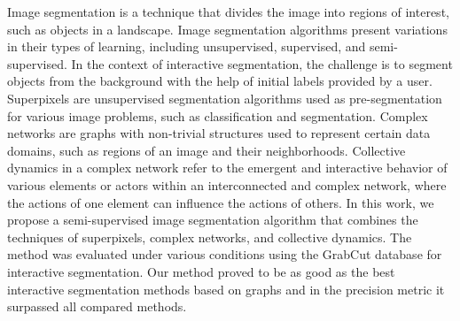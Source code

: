 Image segmentation is a technique that divides the image into regions
of interest, such as objects in a landscape. Image segmentation
algorithms present variations in their types of learning, including
unsupervised, supervised, and semi-supervised. In the context of
interactive segmentation, the challenge is to segment objects from the
background with the help of initial labels provided by a
user. Superpixels are unsupervised segmentation algorithms used as
pre-segmentation for various image problems, such as classification
and segmentation. Complex networks are graphs with non-trivial
structures used to represent certain data domains, such as regions of
an image and their neighborhoods. Collective dynamics in a complex
network refer to the emergent and interactive behavior of various
elements or actors within an interconnected and complex network, where
the actions of one element can influence the actions of others. In
this work, we propose a semi-supervised image segmentation algorithm
that combines the techniques of superpixels, complex networks, and
collective dynamics. The method was evaluated under various conditions
using the GrabCut database for interactive segmentation. Our method
proved to be as good as the best interactive segmentation methods
based on graphs and in the precision metric it surpassed all compared
methods.

